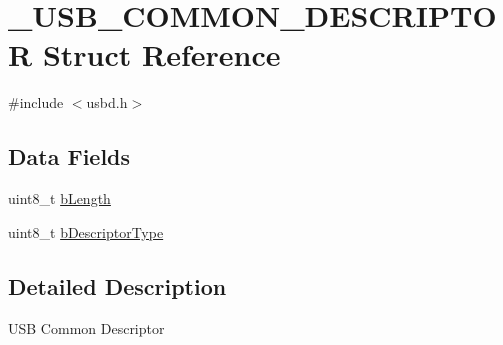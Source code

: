 \hypertarget{struct__USB__COMMON__DESCRIPTOR}{\section{\-\_\-\-U\-S\-B\-\_\-\-C\-O\-M\-M\-O\-N\-\_\-\-D\-E\-S\-C\-R\-I\-P\-T\-O\-R Struct Reference}
\label{struct__USB__COMMON__DESCRIPTOR}
}


{\ttfamily \#include $<$usbd.\-h$>$}

\subsection*{Data Fields}
\begin{DoxyCompactItemize}
\item 
uint8\-\_\-t \hyperlink{struct__USB__COMMON__DESCRIPTOR_a3b232c5c49b059c8df010496ca69868b}{b\-Length}
\item 
uint8\-\_\-t \hyperlink{struct__USB__COMMON__DESCRIPTOR_a67186df405d9bc8ed78bcf60926be924}{b\-Descriptor\-Type}
\end{DoxyCompactItemize}


\subsection{Detailed Description}
U\-S\-B Common Descriptor 

